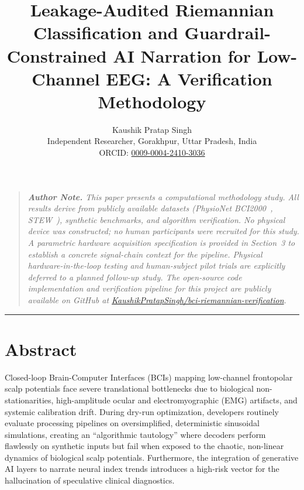 \documentclass[11pt]{article}
\title{\Large\textbf{Leakage-Audited Riemannian Classification and Guardrail-Constrained AI Narration for Low-Channel EEG: A Verification Methodology}}
\author{Kaushik Pratap Singh\\
\small Independent Researcher, Gorakhpur, Uttar Pradesh, India\\
\small ORCID: \href{https://orcid.org/0009-0004-2410-3036}{0009-0004-2410-3036}}
\date{}
\begin{document}
\maketitle

\begin{quote}
\small\itshape
\textbf{Author Note.} This paper presents a computational methodology study. All results derive from publicly available datasets (PhysioNet BCI2000~\cite{schalk2004}, STEW~\cite{lim2018}), synthetic benchmarks, and algorithm verification. No physical device was constructed; no human participants were recruited for this study. A parametric hardware acquisition specification is provided in Section~3 to establish a concrete signal-chain context for the pipeline. Physical hardware-in-the-loop testing and human-subject pilot trials are explicitly deferred to a planned follow-up study. The open-source code implementation and verification pipeline for this project are publicly available on GitHub at \href{https://github.com/KaushikPratapSingh/bci-riemannian-verification}{KaushikPratapSingh/bci-riemannian-verification}.
\end{quote}

\hrule
\vspace{1em}

\section*{Abstract}

Closed-loop Brain-Computer Interfaces (BCIs) mapping low-channel frontopolar scalp potentials face severe translational bottlenecks due to biological non-stationarities, high-amplitude ocular and electromyographic (EMG) artifacts, and systemic calibration drift. During dry-run optimization, developers routinely evaluate processing pipelines on oversimplified, deterministic sinusoidal simulations, creating an ``algorithmic tautology'' where decoders perform flawlessly on synthetic inputs but fail when exposed to the chaotic, non-linear dynamics of biological scalp potentials. Furthermore, the integration of generative AI layers to narrate neural index trends introduces a high-risk vector for the hallucination of speculative clinical diagnostics.
\end{document}
